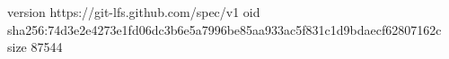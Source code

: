version https://git-lfs.github.com/spec/v1
oid sha256:74d3e2e4273e1fd06dc3b6e5a7996be85aa933ac5f831c1d9bdaecf62807162c
size 87544
